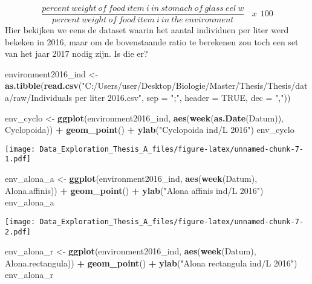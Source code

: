 \documentclass[]{article}
\newenvironment{Shaded}{\begin{snugshade}}{\end{snugshade}}
\newcommand{\KeywordTok}[1]{\textcolor[rgb]{0.13,0.29,0.53}{\textbf{#1}}}
\newcommand{\DataTypeTok}[1]{\textcolor[rgb]{0.13,0.29,0.53}{#1}}
\newcommand{\StringTok}[1]{\textcolor[rgb]{0.31,0.60,0.02}{#1}}
\newcommand{\OtherTok}[1]{\textcolor[rgb]{0.56,0.35,0.01}{#1}}
\newcommand{\OperatorTok}[1]{\textcolor[rgb]{0.81,0.36,0.00}{\textbf{#1}}}
\newcommand{\NormalTok}[1]{#1}
\begin{document}
\[ \frac{percent~weight~of~food~item~i~in~stomach~of~glass~eel~w}{percent~weight~of~food~item~i~in~the~environment}~~~~ x ~~ 100  \]
Hier bekijken we eens de dataset waarin het aantal individuen per liter
werd bekeken in 2016, maar om de bovenstaande ratio te berekenen zou
toch een set van het jaar 2017 nodig zijn. Is die er?

\begin{Shaded}
\begin{Highlighting}[]
\NormalTok{environment2016_ind <-}\StringTok{ }\KeywordTok{as.tibble}\NormalTok{(}\KeywordTok{read.csv}\NormalTok{(}\StringTok{"C:/Users/user/Desktop/Biologie/Master/Thesis/Thesis/data/raw/Individuals per liter 2016.csv"}\NormalTok{, }\DataTypeTok{sep =} \StringTok{";"}\NormalTok{, }\DataTypeTok{header =} \OtherTok{TRUE}\NormalTok{, }\DataTypeTok{dec =} \StringTok{","}\NormalTok{))}

\NormalTok{env_cyclo <-}\StringTok{ }\KeywordTok{ggplot}\NormalTok{(environment2016_ind, }\KeywordTok{aes}\NormalTok{(}\KeywordTok{week}\NormalTok{(}\KeywordTok{as.Date}\NormalTok{(Datum)), Cyclopoida)) }\OperatorTok{+}
\StringTok{  }\KeywordTok{geom_point}\NormalTok{() }\OperatorTok{+}
\StringTok{  }\KeywordTok{ylab}\NormalTok{(}\StringTok{"Cyclopoida ind/L 2016"}\NormalTok{)}
\NormalTok{env_cyclo}
\end{Highlighting}
\end{Shaded}

\texttt{[image: Data\_Exploration\_Thesis\_A\_files/figure-latex/unnamed-chunk-7-1.pdf]}

\begin{Shaded}
\begin{Highlighting}[]
\NormalTok{env_alona_a <-}\StringTok{ }\KeywordTok{ggplot}\NormalTok{(environment2016_ind, }\KeywordTok{aes}\NormalTok{(}\KeywordTok{week}\NormalTok{(Datum), Alona.affinis)) }\OperatorTok{+}
\StringTok{  }\KeywordTok{geom_point}\NormalTok{() }\OperatorTok{+}
\StringTok{  }\KeywordTok{ylab}\NormalTok{(}\StringTok{"Alona affinis ind/L 2016"}\NormalTok{)}
\NormalTok{env_alona_a}
\end{Highlighting}
\end{Shaded}

\texttt{[image: Data\_Exploration\_Thesis\_A\_files/figure-latex/unnamed-chunk-7-2.pdf]}

\begin{Shaded}
\begin{Highlighting}[]
\NormalTok{env_alona_r <-}\StringTok{ }\KeywordTok{ggplot}\NormalTok{(environment2016_ind, }\KeywordTok{aes}\NormalTok{(}\KeywordTok{week}\NormalTok{(Datum), Alona.rectangula)) }\OperatorTok{+}
\StringTok{  }\KeywordTok{geom_point}\NormalTok{() }\OperatorTok{+}
\StringTok{  }\KeywordTok{ylab}\NormalTok{(}\StringTok{"Alona rectangula ind/L 2016"}\NormalTok{)}
\NormalTok{env_alona_r}
\end{Highlighting}
\end{Shaded}
\end{document}
